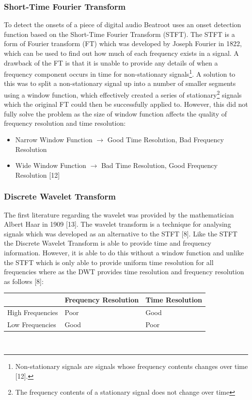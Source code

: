 \documentclass[a4paper, 11pt]{article}
\begin{document}
\subsubsection{Short-Time Fourier Transform}
To detect the onsets of a piece of digital audio Beatroot uses an onset detection function based on the Short-Time Fourier Transform (STFT). The STFT is a form of Fourier transform (FT) which was developed by Joseph Fourier in 1822, which can be used to find out how much of each frequency exists in a signal. A drawback of the FT is that it is unable to provide any details of when a frequency component occurs in time for non-stationary signals\footnote{Non-stationary signals are signals whose frequency contents changes over time [12].}. A solution to this was to split a non-stationary signal up into a number of smaller segments using a window function, which effectively created a series of stationary\footnote{The frequency contents of a stationary signal does not change over time} signals which the original FT could then be successfully applied to. However, this did not fully solve the problem as the size of window function affects the quality of frequency resolution and time resolution:
\begin{itemize}
\item Narrow Window Function $\longrightarrow$  Good Time Resolution, Bad Frequency Resolution
\item Wide Window Function $\longrightarrow$  Bad Time Resolution, Good Frequency Resolution [12]
\end{itemize}

\subsubsection{Discrete Wavelet Transform}
The first literature regarding the wavelet was provided by the mathematician Albert Haar in 1909 [13]. The wavelet transform is a technique for analysing signals which was developed as an alternative to the STFT [8]. Like the STFT the Discrete Wavelet Transform is able to provide time and frequency information. However, it is able to do this without a window function and unlike the STFT which is only able to provide uniform time resolution for all frequencies where as the DWT provides time resolution and frequency resolution as follows [8]:\\

\begin{tabular}{|p{4cm}|p{5cm}|p{5cm}|}
\hline
\textbf{ } & \textbf{Frequency Resolution} & \textbf{Time Resolution}\\ [0.5ex]
\hline
High Frequencies & Poor & Good\\
\hline
Low Frequencies & Good & Poor\\
\hline
\end{tabular}
\\
\end{document}
